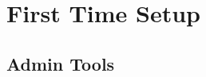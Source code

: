 \documentclass{report}
\begin{document}
 
\chapter{First Time Setup}
\section{Admin Tools}

\
 
\end{document}
